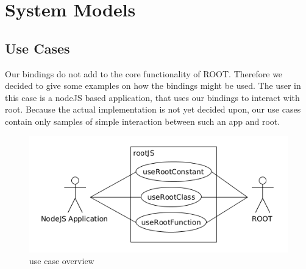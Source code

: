 \chapter{System Models}


\section{Use Cases}
Our bindings do not add to the core functionality of ROOT. Therefore 
we decided to give some examples on how the bindings might be used. The 
user in this case is a nodeJS based application, that uses our bindings 
to interact with root. Because the actual implementation is not yet 
decided upon, our use cases contain only samples of simple interaction 
between such an app and root.
\begin{figure}[htb]
	\centering
	\includegraphics[width=18cm]{./latex/resources/usecaseOverview.png}
	\caption{use case overview}
\end{figure}

\pagebreak[4]


